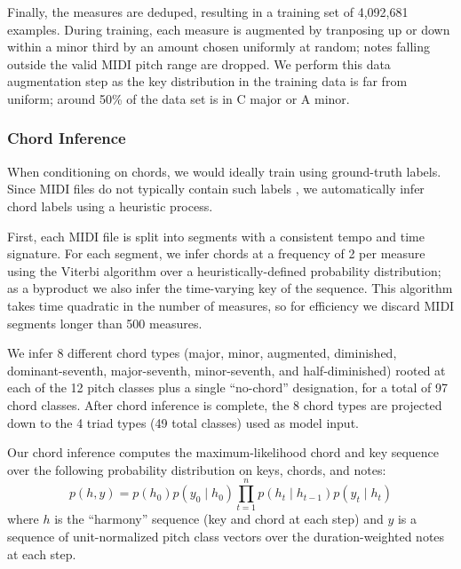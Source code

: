 \documentclass{article}
\begin{document}
Finally, the measures are deduped, resulting in a training set of 4,092,681 examples. During training, each measure is augmented by tranposing up or down within a minor third by an amount chosen uniformly at random; notes falling outside the valid MIDI pitch range are dropped.  We perform this data augmentation step as the key distribution in the training data is far from uniform; around 50\% of the data set is in C major or A minor.

\subsubsection{Chord Inference}
When conditioning on chords, we would ideally train using ground-truth labels.  Since MIDI files do not typically contain such labels \cite{raffel2016extracting}, we automatically infer chord labels using a heuristic process.

First, each MIDI file is split into segments with a consistent tempo and time signature.  For each segment, we infer chords at a frequency of 2 per measure using the Viterbi algorithm \cite{viterbi1967error} over a heuristically-defined probability distribution; as a byproduct we also infer the time-varying key of the sequence.  This algorithm takes time quadratic in the number of measures, so for efficiency we discard MIDI segments longer than 500 measures.

We infer 8 different chord types (major, minor, augmented, diminished, dominant-seventh, major-seventh, minor-seventh, and half-diminished) rooted at each of the 12 pitch classes plus a single ``no-chord'' designation, for a total of 97 chord classes.  After chord inference is complete, the 8 chord types are projected down to the 4 triad types (49 total classes) used as model input.

Our chord inference computes the maximum-likelihood chord and key sequence over the following probability distribution on keys, chords, and notes:
\begin{equation}
    p(h, y) = p(h_0) p(y_0 \mid h_0) \prod_{t=1}^n p(h_t \mid h_{t-1}) p(y_t \mid h_t)
\end{equation}
where $h$ is the ``harmony'' sequence (key and chord at each step) and $y$ is a sequence of unit-normalized pitch class vectors over the duration-weighted notes at each step.
\end{document}
